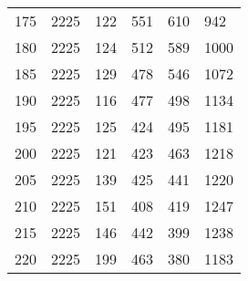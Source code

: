 \begin{longtable}{|l|l|l|l|l|l|}
175 & 2225 & 122 & 551 & 610 & 942 \\
180 & 2225 & 124 & 512 & 589 & 1000 \\
185 & 2225 & 129 & 478 & 546 & 1072 \\
190 & 2225 & 116 & 477 & 498 & 1134 \\
195 & 2225 & 125 & 424 & 495 & 1181 \\
200 & 2225 & 121 & 423 & 463 & 1218 \\
205 & 2225 & 139 & 425 & 441 & 1220 \\
210 & 2225 & 151 & 408 & 419 & 1247 \\
215 & 2225 & 146 & 442 & 399 & 1238 \\
220 & 2225 & 199 & 463 & 380 & 1183 \\

	\bottomrule
\end{longtable}




